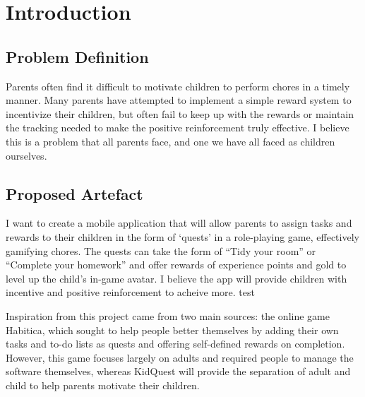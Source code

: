 

\chapter{Introduction}
\label{chap:intro}

\section{Problem Definition}
Parents often find it difficult to motivate children to perform chores in a timely manner. 
Many parents have attempted to implement a simple reward system to incentivize their children, but often fail to keep up with the rewards or maintain the tracking needed to make the positive reinforcement truly effective.
I believe this is a problem that all parents face, and one we have all faced as children ourselves.  

\section{Proposed Artefact}
I want to create a mobile application that will allow parents to assign tasks and rewards to their children in the form of `quests' in a role-playing game, effectively gamifying chores. 
The quests can take the form of ``Tidy your room'' or ``Complete your homework'' and offer rewards of experience points and gold to level up the child's in-game avatar. 
I believe the app will provide children with incentive and positive reinforcement to acheive more. test

Inspiration from this project came from two main sources: the online game Habitica, which sought to help people better themselves by adding their own tasks and to-do lists as quests and offering self-defined rewards on completion. 
However, this game focuses largely on adults and required people to manage the software themselves, whereas KidQuest will provide the separation of adult and child to help parents motivate their children.

